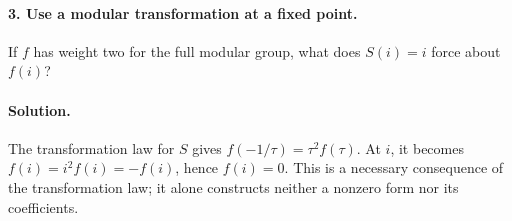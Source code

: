 \paragraph{3. Use a modular transformation at a fixed point.}
If $f$ has weight two for the full modular group, what does $S(i)=i$
force about $f(i)$?

\paragraph{Solution.}
The transformation law for $S$ gives $f(-1/\tau)=\tau^2 f(\tau)$.
At $i$, it becomes $f(i)=i^2f(i)=-f(i)$, hence $f(i)=0$.
This is a necessary consequence of the transformation law; it alone
constructs neither a nonzero form nor its coefficients.


